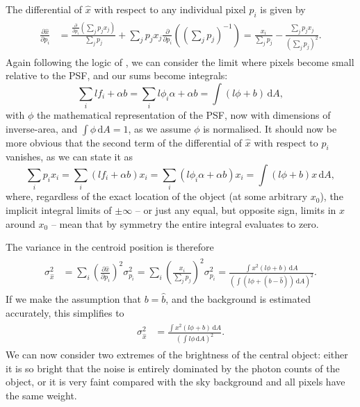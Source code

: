 \documentclass[SE,lsstdraft,authoryear,toc]{lsstdoc}
\begin{document}
The differential of $\hat{x}$ with respect to any individual pixel $p_i$ is given by
\begin{align}
\begin{split}
  \frac{\partial \hat{x}}{\partial p_i} &= \frac{\frac{\partial}{\partial p_i} \left(\sum_j p_j x_j\right)}{\sum_j p_j} + \sum_j p_j x_j \frac{\partial}{\partial p_i}\left(\left(\sum_j p_j\right)^{-1}\right)
                                        = \frac{x_i}{\sum_j p_j} - \frac{\sum_j p_j x_j} {\left(\sum_j p_j\right)^{2}}.
\end{split}
\end{align}
Again following the logic of \citet{King:1983aa}, we can consider the limit where pixels become small relative to the PSF, and our sums become integrals:
\begin{equation}
  \sum_i l f_i + \alpha b = \sum_i l \phi_i \alpha + \alpha b = \int\! (l \phi + b)\, \mathrm{d}A,
\end{equation}
with $\phi$ the mathematical representation of the PSF, now with dimensions of inverse-area, and $\int\! \phi\,\mathrm{d}A = 1$, as we assume $\phi$ is normalised.
It should now be more obvious that the second term of the differential of $\hat{x}$ with respect to $p_i$ vanishes, as we can state it as
\begin{equation}
  \sum_i p_i x_i = \sum_i (l f_i + \alpha b) x_i = \sum_i (l \phi_i \alpha + \alpha b) x_i = \int\! (l \phi + b) x\, \mathrm{d}A,
\end{equation}
where, regardless of the exact location of the object (at some arbitrary $x_0$), the implicit integral limits of $\pm\infty$ -- or just any equal, but opposite sign, limits in $x$ around $x_0$ -- mean that by symmetry the entire integral evaluates to zero.

The variance in the centroid position is therefore
\begin{align}
\begin{split}
  \sigma_{\hat{x}}^2 &= \sum_i \left(\frac{\partial \hat{x}}{\partial p_i}\right)^2 \sigma_{p_i}^2 = \sum_i \left(\frac{x_i}{\sum_j p_j}\right)^2 \sigma_{p_i}^2 
                     = \frac{\int\!x^2(l\phi + b)\,\mathrm{d}A}{\left(\int\!(l\phi + (b - \hat{b}))\,\mathrm{d}A\right)^2}.
\end{split}
\end{align}
If we make the assumption that $b = \hat{b}$, and the background is estimated accurately, this simplifies to
\begin{align}
\begin{split}
  \sigma_{\hat{x}}^2 &= \frac{\int\!x^2(l\phi + b)\,\mathrm{d}A}{\left(\int\!l\phi\,\mathrm{d}A\right)^2}.
\end{split}
\end{align}
We can now consider two extremes of the brightness of the central object: either it is so bright that the noise is entirely dominated by the photon counts of the object, or it is very faint compared with the sky background and all pixels have the same weight.
\end{document}
